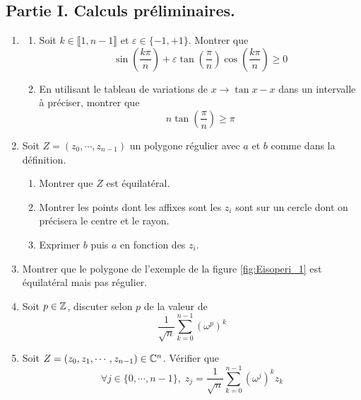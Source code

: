 \subsection*{Partie I. Calculs préliminaires.}
\begin{enumerate}
 \item 
\begin{enumerate}
 \item Soit $k\in \llbracket 1 , n-1 \rrbracket$ et $\varepsilon\in\{-1,+1\}$. Montrer que 
\begin{displaymath}
 \sin\left( \frac{k\pi}{n}\right) +\varepsilon \tan\left( \frac{\pi}{n}\right) \cos\left( \frac{k\pi}{n}\right)\geq 0  
\end{displaymath}
\item En utilisant le tableau de variations de $x \rightarrow \tan x -x$ dans un intervalle à préciser, montrer que 
\begin{displaymath}
 n \tan\left( \frac{\pi}{n}\right) \geq \pi
\end{displaymath}

\end{enumerate}

\item Soit $Z=(z_0,\cdots,z_{n-1})$ un polygone régulier avec $a$ et $b$ comme dans la définition.
\begin{enumerate}
  \item Montrer que $Z$ est équilatéral.
  \item Montrer les points dont les affixes sont les $z_i$ sont sur un cercle dont on précisera le centre et le rayon.
  \item Exprimer $b$ puis $a$ en fonction des $z_i$.
\end{enumerate}
\item Montrer que le polygone de l'exemple de la figure \ref{fig:Eisoperi_1} est équilatéral mais pas régulier.
\item Soit $p\in \mathbb{Z}$, discuter selon $p$ de la valeur de 
\begin{displaymath}
 \frac{1}{\sqrt{n}}\sum_{k=0}^{n-1}(\omega^p)^k
\end{displaymath}
\item Soit $Z= (z_0,z_1,\cdots,z_{n-1})\in \mathbb{C}^n$. Vérifier que
\begin{displaymath}
 \forall j\in \{0,\cdots,n-1\},\; z_j = \frac{1}{\sqrt{n}}\sum_{k=0}^{n-1}(\omega^j)^k \widehat{z}_k 
\end{displaymath}
\end{enumerate}
